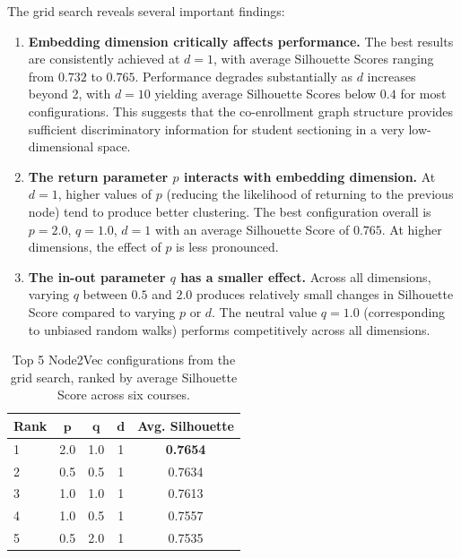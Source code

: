 \documentclass[pdflatex,sn-mathphys-num,iicol]{sn-jnl}%
\theoremstyle{thmstyleone}%
\theoremstyle{thmstyletwo}%
\theoremstyle{thmstylethree}%
\begin{document}
The grid search reveals several important findings:

\begin{enumerate}
\item \textbf{Embedding dimension critically affects performance.} The best results are consistently achieved at $d=1$, with average Silhouette Scores ranging from $0.732$ to $0.765$. Performance degrades substantially as $d$ increases beyond 2, with $d=10$ yielding average Silhouette Scores below $0.4$ for most configurations. This suggests that the co-enrollment graph structure provides sufficient discriminatory information for student sectioning in a very low-dimensional space.

\item \textbf{The return parameter $p$ interacts with embedding dimension.} At $d=1$, higher values of $p$ (reducing the likelihood of returning to the previous node) tend to produce better clustering. The best configuration overall is $p=2.0$, $q=1.0$, $d=1$ with an average Silhouette Score of $0.765$. At higher dimensions, the effect of $p$ is less pronounced.

\item \textbf{The in-out parameter $q$ has a smaller effect.} Across all dimensions, varying $q$ between $0.5$ and $2.0$ produces relatively small changes in Silhouette Score compared to varying $p$ or $d$. The neutral value $q=1.0$ (corresponding to unbiased random walks) performs competitively across all dimensions.
\end{enumerate}

\begin{table}[t]
\centering
\caption{Top 5 Node2Vec configurations from the grid search, ranked by average Silhouette Score across six courses.}
\label{tab:grid_search_top5}
\begin{tabular}{lcccc}
\toprule
\textbf{Rank} & $\mathbf{p}$ & $\mathbf{q}$ & $\mathbf{d}$ & \textbf{Avg. Silhouette} \\
\midrule
1 & 2.0 & 1.0 & 1 & \textbf{0.7654} \\
2 & 0.5 & 0.5 & 1 & 0.7634 \\
3 & 1.0 & 1.0 & 1 & 0.7613 \\
4 & 1.0 & 0.5 & 1 & 0.7557 \\
5 & 0.5 & 2.0 & 1 & 0.7535 \\
\bottomrule
\end{tabular}
\end{table}
\end{document}
